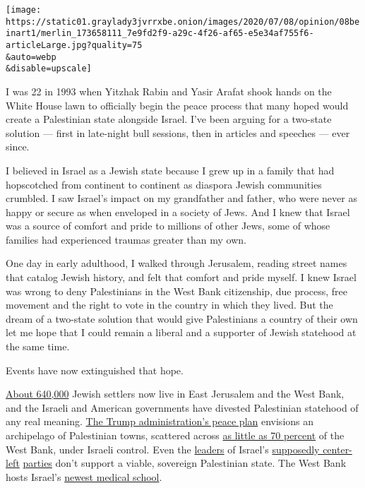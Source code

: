 \texttt{[image: https://static01.graylady3jvrrxbe.onion/images/2020/07/08/opinion/08beinart1/merlin\_173658111\_7e9fd2f9-a29c-4f26-af65-e5e34af755f6-articleLarge.jpg?quality=75\\\&auto=webp\\\&disable=upscale]}

I was 22 in 1993 when Yitzhak Rabin and Yasir Arafat shook hands on the
White House lawn to officially begin the peace process that many hoped
would create a Palestinian state alongside Israel. I've been arguing for
a two-state solution --- first in late-night bull sessions, then in
articles and speeches --- ever since.

I believed in Israel as a Jewish state because I grew up in a family
that had hopscotched from continent to continent as diaspora Jewish
communities crumbled. I saw Israel's impact on my grandfather and
father, who were never as happy or secure as when enveloped in a society
of Jews. And I knew that Israel was a source of comfort and pride to
millions of other Jews, some of whose families had experienced traumas
greater than my own.

One day in early adulthood, I walked through Jerusalem, reading street
names that catalog Jewish history, and felt that comfort and pride
myself. I knew Israel was wrong to deny Palestinians in the West Bank
citizenship, due process, free movement and the right to vote in the
country in which they lived. But the dream of a two-state solution that
would give Palestinians a country of their own let me hope that I could
remain a liberal and a supporter of Jewish statehood at the same time.

Events have now extinguished that hope.

\href{https://fmep.org/resource/settlement-report-october-11-2019/}{About
640,000} Jewish settlers now live in East Jerusalem and the West Bank,
and the Israeli and American governments have divested Palestinian
statehood of any real meaning.
\href{https://www.nytimes3xbfgragh.onion/2020/01/28/world/middleeast/peace-plan.html}{The
Trump administration's peace plan} envisions an archipelago of
Palestinian towns, scattered across
\href{https://www.nytimes3xbfgragh.onion/2020/01/28/world/middleeast/israel-west-bank-annex-sovereignty.html}{as
little as 70 percent} of the West Bank, under Israeli control. Even the
\href{https://www.nytimes3xbfgragh.onion/2019/02/27/opinion/israel-election-two-state-solution.html}{leaders}
of Israel's
\href{https://www.timesofisrael.com/joining-forces-with-gantz-yaalon-rules-out-support-for-two-state-solution/}{supposedly
center-left}
\href{https://www.haaretz.com/israel-news/elections/yair-lapid-outlines-four-demands-for-peace-with-palestinians-1.7000533}{parties}
don't support a viable, sovereign Palestinian state. The West Bank hosts
Israel's
\href{https://www.timesofisrael.com/us-ambassador-toasts-opening-of-new-israeli-medical-school-in-west-bank/}{newest
medical school}.

